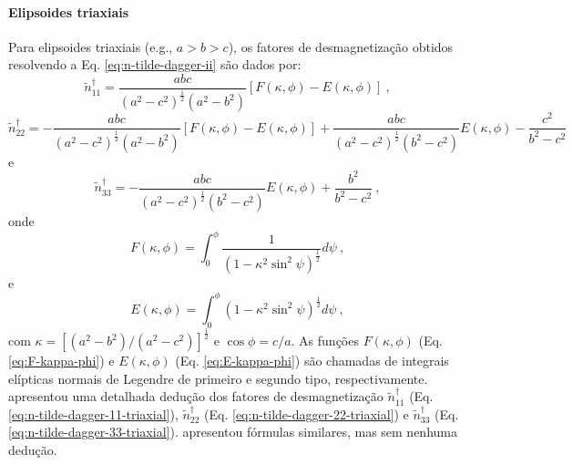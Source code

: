 \paragraph*{Elipsoides triaxiais}

Para elipsoides triaxiais (e.g., $a > b > c$), os fatores de desmagnetização obtidos resolvendo a Eq. \ref{eq:n-tilde-dagger-ii} são dados por:
\begin{equation}
\tilde{n}^{\dagger}_{11} = \frac{abc}
{\left( a^{2} - c^{2} \right)^{\frac{1}{2}} 
	\left( a^{2} - b^{2} \right)} 
\left[ F(\kappa, \phi) - E(\kappa, \phi) \right] \: ,
\label{eq:n-tilde-dagger-11-triaxial}
\end{equation}
\begin{equation}
\tilde{n}^{\dagger}_{22} = 
-\frac{abc}
{\left( a^{2} - c^{2} \right)^{\frac{1}{2}} 
	\left( a^{2} - b^{2} \right)} 
\left[ F(\kappa, \phi) - E(\kappa, \phi) \right] + 
\frac{abc}
{\left( a^{2} - c^{2} \right)^{\frac{1}{2}} 
	\left( b^{2} - c^{2} \right)} E(\kappa, \phi)
- \frac{c^{2}}{b^{2} - c^{2}}
\label{eq:n-tilde-dagger-22-triaxial}
\end{equation}
e
\begin{equation}
\tilde{n}^{\dagger}_{33} = 
-\frac{abc}
{\left( a^{2} - c^{2} \right)^{\frac{1}{2}} 
	\left( b^{2} - c^{2} \right)} E(\kappa, \phi) +
\frac{b^{2}}{b^{2} - c^{2}} \: ,
\label{eq:n-tilde-dagger-33-triaxial}
\end{equation}
onde
\begin{equation}
F(\kappa, \phi) = 
\int^{\phi}_{0} 
\frac{1}{\left( 1 - \kappa^{2} \sin^{2} \psi \right)^{\frac{1}{2}}}
d\psi \: ,
\label{eq:F-kappa-phi}
\end{equation}
e
\begin{equation}
E(\kappa, \phi) = 
\int^{\phi}_{0} 
\left( 1 - \kappa^{2} \sin^{2} \psi \right)^{\frac{1}{2}}
d\psi \: ,
\label{eq:E-kappa-phi}
\end{equation}
com $\kappa = \left[ \left( a^{2} - b^{2} \right) / 
\left( a^{2} - c^{2} \right) \right]^{\frac{1}{2}}$ e
$\cos \phi = c/a$.
As funções $F(\kappa, \phi)$ (Eq. \ref{eq:F-kappa-phi}) e 
$E(\kappa, \phi)$ (Eq. \ref{eq:E-kappa-phi}) são chamadas de integrais elípticas normais de Legendre de primeiro e segundo tipo, respectivamente. \citet{stoner1945} apresentou uma detalhada dedução dos fatores de desmagnetização $\tilde{n}^{\dagger}_{11}$ (Eq. \ref{eq:n-tilde-dagger-11-triaxial}), $\tilde{n}^{\dagger}_{22}$ (Eq. \ref{eq:n-tilde-dagger-22-triaxial}) e $\tilde{n}^{\dagger}_{33}$ (Eq. \ref{eq:n-tilde-dagger-33-triaxial}). \citet{clark1986} apresentou fórmulas similares, mas sem nenhuma dedução.


